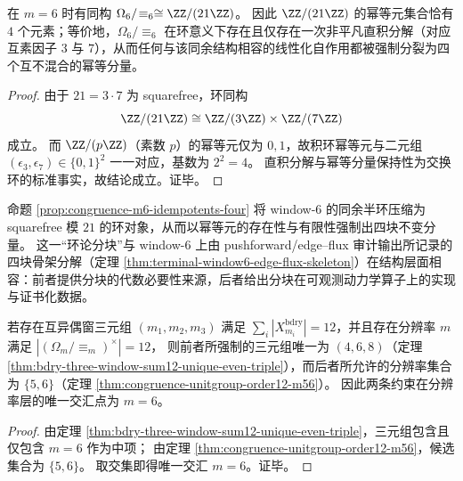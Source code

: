 \begin{proposition}\label{prop:congruence-m6-idempotents-four}
在 \(m=6\) 时有同构 \(\Omega_6/\!\equiv_6\cong \ZZ/(21\ZZ)\)。
因此 \(\ZZ/(21\ZZ)\) 的幂等元集合恰有 \(4\) 个元素；等价地，\(\Omega_6/\!\equiv_6\) 在环意义下存在且仅存在一次非平凡直积分解（对应互素因子 \(3\) 与 \(7\)），从而任何与该同余结构相容的线性化自作用都被强制分裂为四个互不混合的幂等分量。
\end{proposition}
\begin{proof}
由于 \(21=3\cdot 7\) 为 squarefree，环同构
\[
\ZZ/(21\ZZ)\cong \ZZ/(3\ZZ)\times \ZZ/(7\ZZ)
\]
成立。
而 \(\ZZ/(p\ZZ)\)（素数 \(p\)）的幂等元仅为 \(0,1\)，故积环幂等元与二元组 \((\epsilon_3,\epsilon_7)\in\{0,1\}^2\) 一一对应，基数为 \(2^2=4\)。
直积分解与幂等分量保持性为交换环的标准事实，故结论成立。证毕。
\end{proof}

\begin{remark}\label{rem:m6-idempotents-four-block-skeleton}
命题 \ref{prop:congruence-m6-idempotents-four} 将 window-\(6\) 的同余半环压缩为 squarefree 模 \(21\) 的环对象，从而以幂等元的存在性与有限性强制出四块不变分量。
这一“环论分块”与 window-\(6\) 上由 pushforward/edge--flux 审计输出所记录的四块骨架分解（定理 \ref{thm:terminal-window6-edge-flux-skeleton}）在结构层面相容：前者提供分块的代数必要性来源，后者给出分块在可观测动力学算子上的实现与证书化数据。
\end{remark}

\begin{corollary}[两条独立的 \(12\) 约束在分辨率 \(m=6\) 的唯一交汇]\label{cor:double-12-constraints-unique-intersection-m6}
若存在互异偶窗三元组 \((m_1,m_2,m_3)\) 满足 \(\sum_i |X^{\mathrm{bdry}}_{m_i}|=12\)，并且存在分辨率 \(m\) 满足 \(|(\Omega_m/\!\equiv_m)^\times|=12\)，
则前者所强制的三元组唯一为 \((4,6,8)\)（定理 \ref{thm:bdry-three-window-sum12-unique-even-triple}），而后者所允许的分辨率集合为 \(\{5,6\}\)（定理 \ref{thm:congruence-unitgroup-order12-m56}）。
因此两条约束在分辨率层的唯一交汇点为 \(m=6\)。
\end{corollary}
\begin{proof}
由定理 \ref{thm:bdry-three-window-sum12-unique-even-triple}，三元组包含且仅包含 \(m=6\) 作为中项；
由定理 \ref{thm:congruence-unitgroup-order12-m56}，候选集合为 \(\{5,6\}\)。
取交集即得唯一交汇 \(m=6\)。证毕。
\end{proof}

